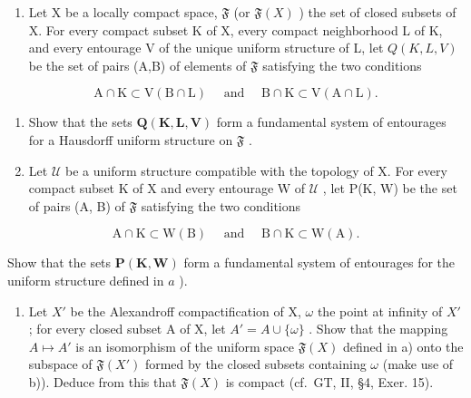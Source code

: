 \exercisesection{}

\begin{enumerate}
\def\labelenumi{\arabic{enumi})}
\tightlist
\item
  Let X be a locally compact space, \(\mathfrak{F}\) (or \(\mathfrak{F}(X)\) ) the set of closed subsets of X. For every compact subset K of X, every compact neighborhood L of K, and every entourage V of the unique uniform structure of L, let \(Q(K,L,V)\) be the set of pairs (A,B) of elements of \(\mathfrak{F}\) satisfying the two conditions
\end{enumerate}

\[
\mathrm{A} \cap \mathrm{K} \subset \mathrm{V} (\mathrm{B} \cap \mathrm{L}) \quad \text { and } \quad \mathrm{B} \cap \mathrm{K} \subset \mathrm{V} (\mathrm{A} \cap \mathrm{L}).
\]

\begin{enumerate}
\def\labelenumi{\alph{enumi})}
\item
  Show that the sets \(\mathbf{Q}(\mathbf{K},\mathbf{L},\mathbf{V})\) form a fundamental system of entourages for a Hausdorff uniform structure on \(\mathfrak{F}\) .
\item
  Let \(\mathcal{U}\) be a uniform structure compatible with the topology of X. For every compact subset K of X and every entourage W of \(\mathcal{U}\) , let P(K, W) be the set of pairs (A, B) of \(\mathfrak{F}\) satisfying the two conditions
\end{enumerate}

\[
\mathrm{A} \cap \mathrm{K} \subset \mathrm{W} (\mathrm{B}) \quad \text { and } \quad \mathrm{B} \cap \mathrm{K} \subset \mathrm{W} (\mathrm{A}).
\]

Show that the sets \(\mathbf{P}(\mathbf{K},\mathbf{W})\) form a fundamental system of entourages for the uniform structure defined in \(a\) ).

\begin{enumerate}
\def\labelenumi{\alph{enumi})}
\setcounter{enumi}{2}
\tightlist
\item
  Let \(X'\) be the Alexandroff compactification of X, \(\omega\) the point at infinity of \(X'\) ; for every closed subset A of X, let \(A' = A \cup \{\omega\}\) . Show that the mapping \(A \mapsto A'\) is an isomorphism of the uniform space \(\mathfrak{F}(X)\) defined in a) onto the subspace of \(\mathfrak{F}(X')\) formed by the closed subsets containing \(\omega\) (make use of b)). Deduce from this that \(\mathfrak{F}(X)\) is compact (cf.~GT, II, §4, Exer. 15).
\end{enumerate}

